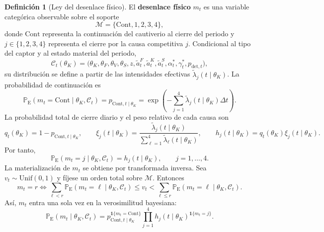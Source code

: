 \documentclass[12pt]{article}
\theoremstyle{definition}
\newtheorem{definition}[theorem]{Definición}
\theoremstyle{remark}
\newcommand{\ProbE}{\mathbb{P}_{\mathrm{E}}}
\newcommand{\Unif}{\mathrm{Unif}}
\newcommand{\1}{\mathbf{1}}
\begin{document}
\medskip
\begin{definition}[Ley del desenlace físico]
\label{def:desenlace-fisico-mt}
El \textbf{desenlace físico} $m_t$ es una variable categórica observable sobre el soporte
\[
\mathcal{M}=\{\mathrm{Cont},1,2,3,4\},
\]
donde $\mathrm{Cont}$ representa la continuación del cautiverio al cierre del periodo y $j\in\{1,2,3,4\}$ representa el cierre por la causa competitiva $j$. Condicional al tipo del captor y al estado material del periodo,
\[
\mathcal{C}_t(\theta_K)
=
\bigl(\theta_K,\theta_F,\theta_V,\theta_S,z,
\tilde a_t^F,\tilde a_t^K,\tilde a_t^S,
\alpha_t^\ast,\gamma_t^\ast,p_{\mathrm{det},t}\bigr),
\]
su distribución se define a partir de las intensidades efectivas $\tilde\lambda_j(t\mid\theta_K)$. La probabilidad de continuación es
\begin{equation}
\label{eq:m-law-cont}
\ProbE(m_t=\mathrm{Cont}\mid\theta_K,\mathcal C_t)
=
p_{\mathrm{Cont},t\mid\theta_K}
=
\exp\left(-\sum_{j=1}^{4}\tilde\lambda_j(t\mid\theta_K)\Delta t\right).
\end{equation}
La probabilidad total de cierre diario y el peso relativo de cada causa son
\begin{equation}
\label{eq:m-law-hazard}
q_t(\theta_K)=1-p_{\mathrm{Cont},t\mid\theta_K},
\qquad
\xi_j(t\mid\theta_K)
=
\frac{\tilde\lambda_j(t\mid\theta_K)}
{\sum_{\ell=1}^{4}\tilde\lambda_\ell(t\mid\theta_K)},
\qquad
h_j(t\mid\theta_K)=q_t(\theta_K)\xi_j(t\mid\theta_K).
\end{equation}
Por tanto,
\begin{equation}
\label{eq:m-law-out}
\ProbE(m_t=j\mid\theta_K,\mathcal C_t)=h_j(t\mid\theta_K),
\qquad j=1,\dots,4.
\end{equation}
La materialización de $m_t$ se obtiene por transformada inversa. Sea $v_t\sim\Unif(0,1)$ y fíjese un orden total sobre $\mathcal{M}$. Entonces
\begin{equation}
\label{eq:m-law-inverse}
m_t=r
\iff
\sum_{\ell<r}\ProbE(m_t=\ell\mid\theta_K,\mathcal C_t)
\le v_t <
\sum_{\ell\le r}\ProbE(m_t=\ell\mid\theta_K,\mathcal C_t).
\end{equation}
Así, $m_t$ entra una sola vez en la verosimilitud bayesiana:
\begin{equation}
\label{eq:m-law-likelihood}
\ProbE(m_t\mid\theta_K,\mathcal C_t)
=
p_{\mathrm{Cont},t\mid\theta_K}^{\mathbf 1\{m_t=\mathrm{Cont}\}}
\prod_{j=1}^{4}
h_j(t\mid\theta_K)^{\mathbf 1\{m_t=j\}}.
\end{equation}
\end{definition}
\end{document}
